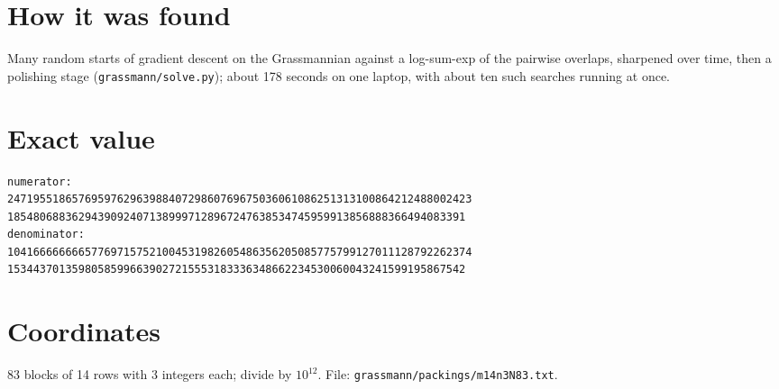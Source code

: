 \documentclass[11pt,a4paper]{article}
\begin{document}
\section{How it was found}
Many random starts of gradient descent on the Grassmannian against a log-sum-exp of the pairwise overlaps, sharpened over time, then a polishing stage (\texttt{grassmann/solve.py}); about 178 seconds on one laptop, with about ten such searches running at once.


\appendix
\section{Exact value}
{\small
\begin{verbatim}
numerator:
247195518657695976296398840729860769675036061086251313100864212488002423
18548068836294390924071389997128967247638534745959913856888366494083391
denominator:
104166666666577697157521004531982605486356205085775799127011128792262374
15344370135980585996639027215553183336348662234530060043241599195867542
\end{verbatim}}

\section{Coordinates}
83 blocks of 14 rows with 3 integers each; divide by $10^{12}$. File: \texttt{grassmann/packings/m14n3N83.txt}.
{\tiny
\begin{multicols}{3}
\end{multicols}}
\end{document}
